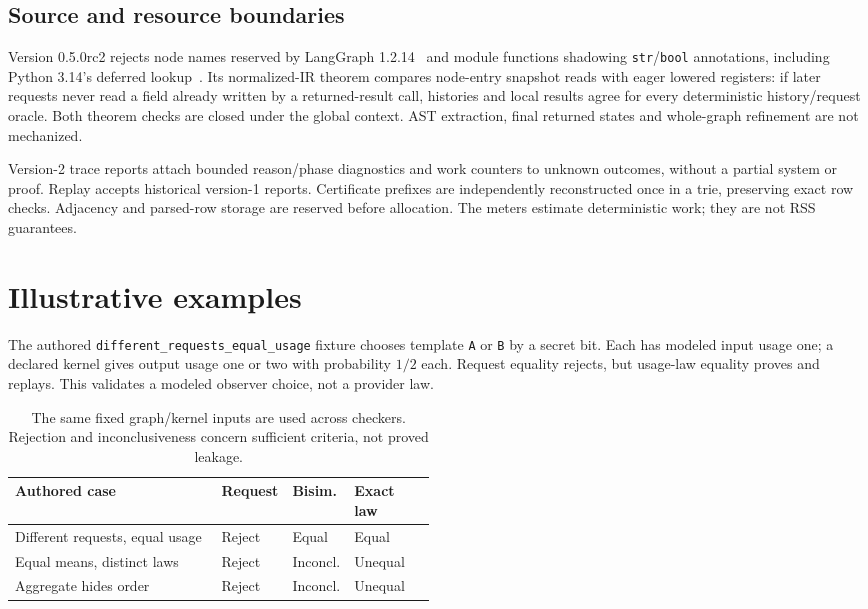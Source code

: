 \documentclass[preprint,12pt,a4paper]{elsarticle}
\begin{document}
\subsection{Source and resource boundaries}
Version 0.5.0rc2 rejects node names reserved by LangGraph 1.2.14~\cite{langgraph} and module functions shadowing \texttt{str}/\texttt{bool} annotations, including Python 3.14's deferred lookup~\cite{annotations}. Its normalized-IR theorem compares node-entry snapshot reads with eager lowered registers: if later requests never read a field already written by a returned-result call, histories and local results agree for every deterministic history/request oracle. Both theorem checks are closed under the global context. AST extraction, final returned states and whole-graph refinement are not mechanized.

Version-2 trace reports attach bounded reason/phase diagnostics and work counters to unknown outcomes, without a partial system or proof. Replay accepts historical version-1 reports. Certificate prefixes are independently reconstructed once in a trie, preserving exact row checks. Adjacency and parsed-row storage are reserved before allocation. The meters estimate deterministic work; they are not RSS guarantees.

\section{Illustrative examples}
The authored \texttt{different\_requests\_equal\_usage} fixture chooses template \texttt{A} or \texttt{B} by a secret bit. Each has modeled input usage one; a declared kernel gives output usage one or two with probability $1/2$ each. Request equality rejects, but usage-law equality proves and replays. This validates a modeled observer choice, not a provider law.

\begin{table}[ht]
\centering\small
\begin{tabular}{p{0.49\linewidth}lll}
\toprule
Authored case & Request & Bisim. & Exact law\\
\midrule
Different requests, equal usage & Reject & Equal & Equal\\
Equal means, distinct laws & Reject & Inconcl. & Unequal\\
Aggregate hides order & Reject & Inconcl. & Unequal\\
\bottomrule
\end{tabular}
\caption{The same fixed graph/kernel inputs are used across checkers. Rejection and inconclusiveness concern sufficient criteria, not proved leakage.}
\label{tab:observers}
\end{table}
\end{document}
